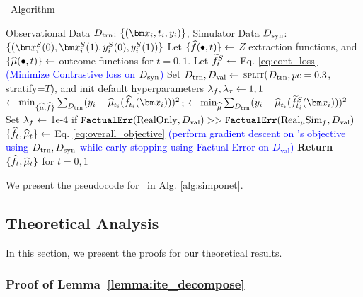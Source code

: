 \label{app:pcode}
\begin{algorithm}[H]
\begin{algorithmic}[1]
    \small
    \caption{\our\ Algorithm}
    \label{alg:simponet}
    \REQUIRE Observational Data $D_{\text{trn}}$: $\{(\xb_i, t_i, y_i)\}$, Simulator Data $D_{\text{syn}}$: $\{(\xb_i^S(0), \xb_i^S(1), y_i^S(0), y_i^S(1))\}$
    \STATE Let $\{\widehat{f}(\bullet, t)\} \leftarrow$ $Z$ extraction functions, and $\{\widehat{\mu}(\bullet, t)\} \leftarrow$ outcome functions for $t=0, 1$.
    \STATE Let $\widetilde{f}^S_t \leftarrow $ Eq. \ref{eq:cont_loss}  \textcolor{blue}{(Minimize Contrastive loss on $D_{\text{syn}}$)}
    \STATE Set $D_{\text{trn}}, D_{\text{val}} \leftarrow$ \textsc{split}($D_{\text{trn}}, pc=0.3$, stratify=$T$), and init default hyperparameters $\lambda_{f}, \lambda_{\tau} \leftarrow 1, 1$
    \STATE \realonly $\leftarrow \min_{\{\realmuhat, \RInvhat\}} \sum_{\trnD}(y_i - \realmuhat_{t_i}(\RInvhat_{t_i}(\xb_i)))^2$; \muonly $\leftarrow \min_{\realmuhat} \sum_{\trnD}(y_i - \realmuhat_{t_i}(\SInvCont_{t_i}(\xb_i)))^2$
    \STATE Set $\lambda_{f} \leftarrow$ 1e-4 if  $\texttt{FactualErr}(\text{RealOnly},  D_{\text{val}}) >> \texttt{FactualErr}(\text{$\text{Real}_\mu\text{Sim}_f$},  D_{\text{val}})$ 
    \STATE $\{\widehat{f}_t, \widehat{\mu}_t\} \leftarrow$ Eq. \ref{eq:overall_objective} \textcolor{blue}{(perform gradient descent on \our's objective using $D_{\text{trn}}, D_{\text{syn}}$ while early stopping using Factual Error on $D_{\text{val}}$)} 
    \STATE \textbf{Return} $\{\widehat{f}_t, \widehat{\mu}_t\}$ for $t=0, 1$
\end{algorithmic}
\end{algorithm}




We present the pseudocode for \our\ in Alg. \ref{alg:simponet}. 

\subsection{Theoretical Analysis}
In this section, we present the proofs for our theoretical results.


\label{app:theory_proofs}

\subsubsection{Proof of Lemma~\ref{lemma:ite_decompose}}
\label{app:lemma:ite_decompose}

    \lemmaitedecompose\

